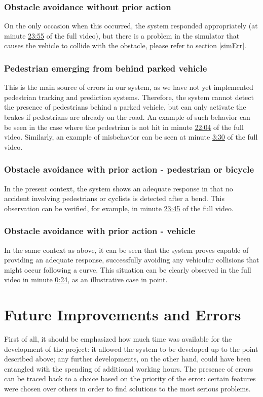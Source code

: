 \documentclass{article}
\begin{document}
\subsubsection{Obstacle avoidance without prior action}
On the only occasion when this occurred, the system responded appropriately (at minute \href{https://youtu.be/RBGWd_so80U?t=1435}{23:55} of the full video),
but there is a problem in the simulator that causes the vehicle to collide with the obstacle, please refer to section \ref{simErr}.
\subsubsection{Pedestrian emerging from behind parked vehicle}
This is the main source of errors in our system, as we have not yet implemented pedestrian tracking and prediction systems. Therefore, the system cannot detect
the presence of pedestrians behind a parked vehicle, but can only activate the brakes if pedestrians are already on the road. An example of such behavior can
be seen in the case where the pedestrian is not hit in minute \href{https://youtu.be/RBGWd_so80U?t=1324}{22:04} of the full video. Similarly, an example of misbehavior can be seen at
minute \href{https://youtu.be/RBGWd_so80U?t=210}{3:30} of the full video.
\subsubsection{Obstacle avoidance with prior action - pedestrian or bicycle}
In the present context, the system shows an adequate response in that no accident involving pedestrians or cyclists is detected after a bend. This observation can
be verified, for example, in minute \href{https://youtu.be/RBGWd_so80U?t=1425}{23:45}  of the full video.
\subsubsection{Obstacle avoidance with prior action - vehicle}
In the same context as above, it can be seen that the system proves capable of providing an adequate response, successfully avoiding any vehicular collisions that might
occur following a curve. This situation can be clearly observed in the full video in minute \href{https://youtu.be/RBGWd_so80U?t=24}{0:24}, as an illustrative case in point.

\section{Future Improvements and Errors}
First of all, it should be emphasized how much time was available for the development of the project: it allowed the system to
be developed up to the point described above; any further developments, on the other hand, could have been entangled with the
spending of additional working hours.
The presence of errors can be traced back to a choice based on the priority of the error: certain features were chosen over
others in order to find solutions to the most serious problems.
\end{document}
